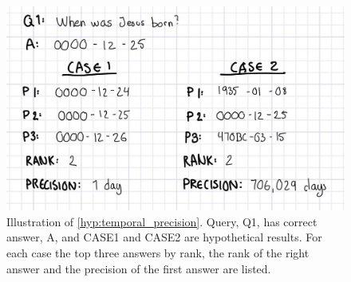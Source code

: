 \begin{figure}[htb]
\centering
\begin{minipage}{0.95\columnwidth}
\centering
\small
\includegraphics[scale=0.13]{content/hypotheses/figures/temporal_precision.jpg}
\caption{Illustration of \autoref{hyp:temporal_precision}. Query, Q1, has correct answer, A, and CASE1 and CASE2 are hypothetical results. For each case the top three answers by rank, the rank of the right answer and the precision of the first answer are listed.
}
\label{fig:temporal_precision}
\end{minipage}
\end{figure}